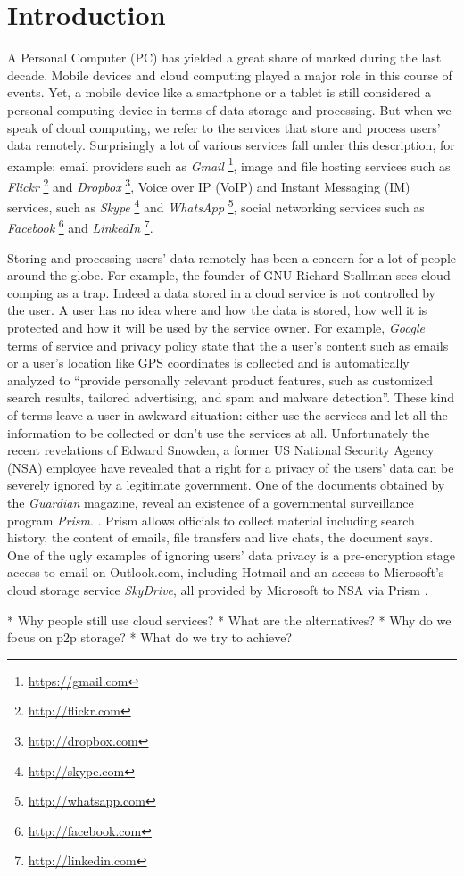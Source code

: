 \section{Introduction}

A Personal Computer (PC) has yielded a great share of marked during the
last decade. Mobile devices and cloud computing played a major role in
this course of events. Yet, a mobile device like a smartphone or a
tablet is still considered a personal computing device in terms of data
storage and processing. But when we speak of cloud computing, we refer to
the services that store and process users' data remotely.
Surprisingly a lot of various services fall under this description,
for example: email providers such as
\emph{Gmail} \footnote{\url{https://gmail.com}},
image and file hosting services such as
\emph{Flickr} \footnote{\url{http://flickr.com}} and
\emph{Dropbox} \footnote{\url{http://dropbox.com}},
Voice over IP (VoIP) and Instant Messaging (IM) services, such as
\emph{Skype} \footnote{\url{http://skype.com}} and
\emph{WhatsApp} \footnote{\url{http://whatsapp.com}},
social networking services such as
\emph{Facebook} \footnote{\url{http://facebook.com}} and
\emph{LinkedIn} \footnote{\url{http://linkedin.com}}.


Storing and processing users' data remotely has been a concern for
a lot of people around the globe. For example, the founder of GNU
Richard Stallman sees cloud comping as a trap\cite{stallman-cloud-08}.
Indeed a data stored in a cloud service is not controlled by the user.
A user has no idea where and how the data is stored, how well it is
protected and how it will be used by the service owner.
For example, \emph{Google} terms of service\cite{google-tos} and
privacy policy\cite{google-privacy} state that the a user's content
such as emails or a user's location like GPS coordinates is collected
and is automatically analyzed to ``provide personally relevant product
features, such as customized search results, tailored advertising,
and spam and malware detection''. These kind of terms leave a user
in awkward situation: either use the services and let all the information
to be collected or don't use the services at all.
Unfortunately the recent revelations\cite{snowden-timeline}
of Edward Snowden, a former US National Security Agency (NSA) employee
have revealed that a right for a privacy of the users' data can be
severely ignored by a legitimate government.
One of the documents obtained by the \emph{Guardian} magazine,
reveal an existence of a governmental surveillance program \emph{Prism}.
\cite{snowden-prism}. Prism allows officials to collect
material including search history, the content of emails, file
transfers and live chats, the document says. One of the ugly examples
of ignoring users' data privacy is a pre-encryption stage access
to email on Outlook.com, including Hotmail and an access to Microsoft's
cloud storage service \emph{SkyDrive}, all provided by Microsoft to NSA
via Prism \cite{snowden-ms-nsa}.

* Why people still use cloud services?
* What are the alternatives?
* Why do we focus on p2p storage?
* What do we try to achieve?
